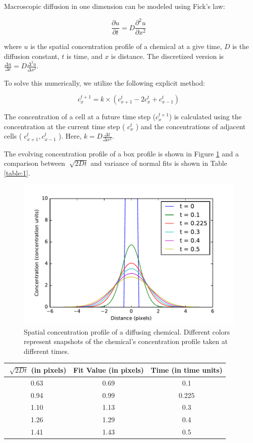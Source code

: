 \documentclass[a4paper]{article}
\begin{document}
Macroscopic diffusion in one dimension can be modeled using Fick's law:

\[ \frac{\partial u }{ \partial t} = D\frac{\partial ^2 u }{ \partial x^2}   \]

where \(u\) is the spatial concentration profile of a chemical at a give time, \(D\) is the diffusion constant, \(t\) is time, and \(x\) is distance. The discretized version is 
\( \frac{\Delta u }{ \Delta t} = D\frac{\Delta ^2 u }{ \Delta x^2}   \).

To solve this numerically, we utilize the following explicit method:

\[ c^{t+1}_{x} = k \times (c^{t}_{x+1} - 2 c^{t}_{x} + c^{t}_{x-1}    ) \]

The concentration of a cell at a future time step (\( c^{t+1}_{x} \)) is calculated using the concentration at the current time step ( \(c^{t}_{x}\) ) and the concentrations of adjacent cells ( \( c^{t}_{x+1}, c^{t}_{x-1} \)   ). Here,  \(k = D\frac{\Delta t}{\Delta x^2}\).

The evolving concentration profile of a box profile is shown in Figure \ref{fig:diffusiongraph} and a comparison between \(\sqrt[]{2Dt}\) and variance of normal fits is shown in Table \ref{table:1}.

\begin{figure}[H]
\centering
\includegraphics[width=.7\linewidth]{diffusiongraph.pdf}
\caption{Spatial concentration profile of a diffusing chemical. Different colors represent snapshots of the chemical's concentration profile taken at different times. }
\label{fig:diffusiongraph}
\end{figure}

\begin{tabular}{  c |  c | c }

\label{table:1}

\(\sqrt[]{2Dt}\) (in pixels) & Fit Value (in pixels) & Time (in time units)\\
\hline
0.63 & 0.69 & 0.1\\
0.94 & 0.99 & 0.225\\
1.10 & 1.13 & 0.3\\
1.26 & 1.29 & 0.4\\
1.41 & 1.43 & 0.5

\end{tabular}
\end{document}

